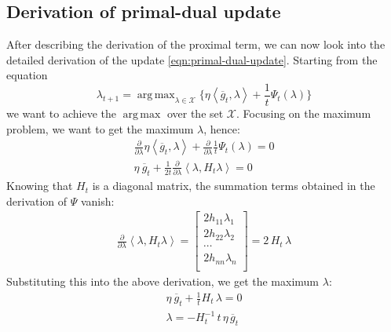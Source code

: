 \documentclass[notitlepage]{article}
\DeclareMathOperator*{\argmax}{arg\,max}
\begin{document}
\subsection{Derivation of primal-dual update}
After describing the derivation of the proximal term, we can now look into the detailed derivation of the update \eqref{eqn:primal-dual-update}. Starting from the equation
\[
  \lambda_{t+1} = \argmax_{\lambda \in \mathcal{X}} \{ \eta \left\langle \overline{g}_t,\lambda \right\rangle + \frac{1}{t} \Psi_t(\lambda) \} 
\]
we want to achieve the $\argmax$ over the set $\mathcal{X}$. Focusing on the maximum problem, we want to get the maximum $\lambda$, hence:
\begin{align*}
  \frac{\partial}{\partial \lambda} \eta \left\langle \overline{g}_t,\lambda \right\rangle + \frac{\partial}{\partial \lambda} \frac{1}{t} \Psi_t(\lambda) = 0 \\
  \eta\ \overline{g}_t + \frac{1}{2t} \frac{\partial}{\partial \lambda} \left\langle \lambda,H_t \lambda \right\rangle = 0 
\end{align*}  
Knowing that $H_t$ is a diagonal matrix, the summation terms obtained in the derivation of $\Psi$ vanish:
\begin{align*}
  \frac{\partial}{\partial \lambda} \left\langle \lambda, H_t \lambda \right\rangle =
  \begin{bmatrix}
    2 h_{11} \lambda_1 \\[2ex]
    2 h_{22} \lambda_2 \\[2ex]
    \cdots \\[2ex]
    2 h_{nn} \lambda_n \\
  \end{bmatrix}
  = 2\, H_t\, \lambda
\end{align*}
Substituting this into the above derivation, we get the maximum $\lambda$:
\begin{align*}
  \eta\ \overline{g}_t + \frac{1}{t} H_t\, \lambda = 0 \\
  \lambda = - H_t^{-1}\, t\, \eta\, \overline{g}_t
\end{align*}
\end{document}
